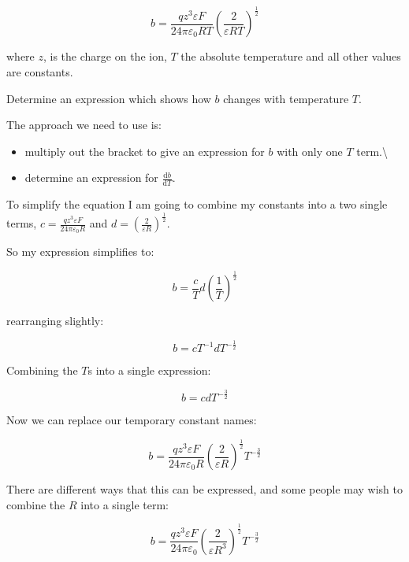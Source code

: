 \documentclass[
]{book}
\providecommand{\tightlist}{%
  \setlength{\itemsep}{0pt}\setlength{\parskip}{0pt}}
\begin{document}
\begin{equation*}
b=\frac{qz^3 \varepsilon F}{24 \pi \varepsilon_0 RT} \left( \frac{2}{ \varepsilon RT} \right)^\frac{1}{2}
\end{equation*}

where \(z\), is the charge on the ion, \(T\) the absolute temperature and all other values are constants.

Determine an expression which shows how \(b\) changes with temperature \(T\).

The approach we need to use is:

\begin{itemize}
\tightlist
\item
  multiply out the bracket to give an expression for \(b\) with only one \(T\) term.\textbackslash{}
\item
  determine an expression for \(\tfrac{\textrm{d}b}{\textrm{d}T}\).
\end{itemize}

To simplify the equation I am going to combine my constants into a two single terms, \(c = \frac{qz^3\varepsilon F}{24 \pi \varepsilon_0 R}\) and \(d= \left( \frac{2}{ \varepsilon R} \right)^\frac{1}{2}\).

So my expression simplifies to:

\begin{equation*}
b=\frac{c}{T} d\left( \frac{1}{T} \right)^\frac{1}{2}
\end{equation*}

rearranging slightly:

\begin{equation*}
b=cT^{-1}dT^{-\frac{1}{2}}
\end{equation*}

Combining the \(T\)s into a single expression:

\begin{equation*}
b=cdT^{-\frac{3}{2}}
\end{equation*}

Now we can replace our temporary constant names:

\begin{equation*}
b=\frac{qz^3\varepsilon F}{24 \pi \varepsilon_0 R}\left( \frac{2}{ \varepsilon R} \right)^\frac{1}{2}T^{-\frac{3}{2}}
\end{equation*}

There are different ways that this can be expressed, and some people may wish to combine the \(R\) into a single term:

\begin{equation*}
b=\frac{qz^3\varepsilon F}{24 \pi \varepsilon_0}\left( \frac{2}{ \varepsilon R^3} \right)^\frac{1}{2}T^{-\frac{3}{2}}
\end{equation*}
\end{document}
